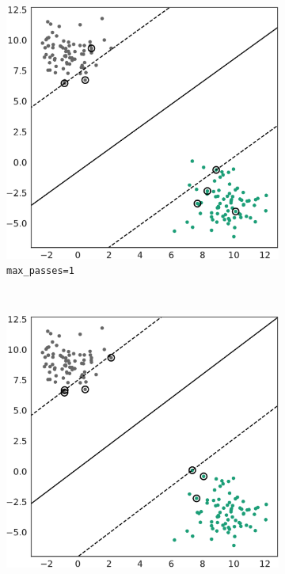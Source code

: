 \begin{figure}[h]
    \centering
    \begin{subfigure}[b]{0.32\textwidth}
        \includegraphics[width=\textwidth]{media_saved/own_test_mpasses_1.pdf}
        \caption{\texttt{max\_passes=1}}
        \label{fig:max_passs_1}
    \end{subfigure}
    ~ %
    \begin{subfigure}[b]{0.32\textwidth}
        \includegraphics[width=\textwidth]{media_saved/own_test_mpasses_15.pdf}

\end{subfigure}
\end{figure}
